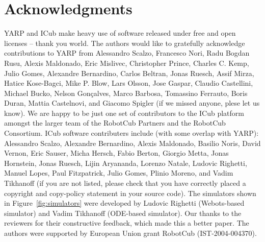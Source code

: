 
\section{Acknowledgments}

YARP and ICub make heavy use of software released under free and open
licenses -- thank you world.
%
The authors would like to gratefully acknowledge contributions to YARP
from Alessandro Scalzo, Francesco Nori, Radu Bogdan Rusu, 
Alexis Maldonado, Eric Mislivec, Christopher
Prince, Charles C. Kemp, Julio Gomes, Alexandre
Bernardino, Carlos Beltran, Jonas Ruesch, Assif Mirza, Hatice
Kose-Bagci, Mike P. Blow, Lars Olsson,
Jose Gaspar, Claudio Castellini, Michael Bucko, Nelson
Gon\c calves, Marco Barbosa, Tomassino Ferrauto, Boris Duran, Mattia
Castelnovi, and Giacomo Spigler 
 (if we missed anyone, plese let us
know).  
%
We are happy to be just one set of contributors to the ICub platform
amongst the larger team of the RobotCub Partners and the RobotCub
Consortium.
%
ICub software contributers include (with some overlap with YARP):
Alessandro Scalzo, Alexandre Bernardino, Alexis Maldonado, Basilio
Noris, David Vernon, Eric Sauser, Micha Hersch, Fabio Berton, Giorgio
Metta, Jonas Hornstein, Jonas Ruesch, Lijin Aryananda, Lorenzo Natale,
Ludovic Righetti, Manuel Lopes, Paul Fitzpatrick, Julio Gomes, Plinio
Moreno, and Vadim Tikhanoff (if you are not listed, please check that
you have correctly placed a copyright and copy-policy statement in
your source code).
%
%
The simulators shown in Figure~\ref{fig:simulators} were developed 
by Ludovic Righetti (Webots-based simulator) and
Vadim Tikhanoff (ODE-based simulator).
%
Our thanks to the reviewers for their constructive feedback, which
made this a better paper.
%
The authors were supported by European Union
grant RobotCub (IST-2004-004370).




